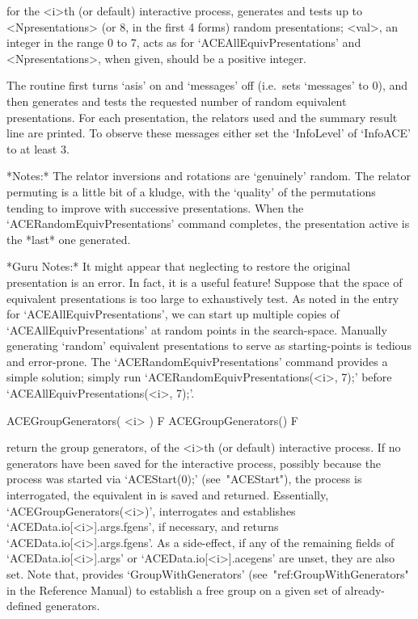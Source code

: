 for the <i>th (or default) interactive {\ACE} process,  generates  and
tests up to <Npresentations> (or 8,  in  the  first  4  forms)  random
presentations; <val>, an integer in the range 0  to  7,  acts  as  for
`ACEAllEquivPresentations' and <Npresentations>, when given, should be
a positive integer.

The routine first  turns  `asis'  on  and  `messages'  off  (i.e.~sets
`messages' to 0), and then generates and tests the requested number of
random equivalent presentations. For each presentation,  the  relators
used and the  summary  result  line  are  printed.  To  observe  these
messages either set the `InfoLevel' of `InfoACE'  to  at  least  3.

*Notes:*
The relator inversions and rotations are \lq{}genuinely'  random.  The
relator permuting is a little bit of a kludge, with the  \lq{}quality'
of the permutations tending to improve with successive  presentations.
When  the   `ACERandomEquivPresentations'   command   completes,   the
presentation active is the *last* one generated.

*Guru Notes:*
It might appear that neglecting to restore the  original  presentation
is an error. In fact, it is a useful feature! Suppose that  the  space
of equivalent presentations is too  large  to  exhaustively  test.  As
noted in the entry for `ACEAllEquivPresentations',  we  can  start  up
multiple copies of `ACEAllEquivPresentations' at random points in  the
search-space. Manually generating `random' equivalent presentations to
serve   as   starting-points   is   tedious   and   error-prone.   The
`ACERandomEquivPresentations'  command  provides  a  simple  solution;
simply    run    `ACERandomEquivPresentations(<i>,     7);'     before
`ACEAllEquivPresentations(<i>, 7);'.

\enditems


\beginitems

\>ACEGroupGenerators( <i> ) F
\>ACEGroupGenerators() F

return  the  {\GAP}  group  generators,  of  the  <i>th  (or  default)
interactive {\ACE} process. If no generators have been saved  for  the
interactive {\ACE} process, possibly because the process  was  started
via   `ACEStart(0);'   (see~"ACEStart"),   the   {\ACE}   process   is
interrogated,  the  equivalent  in  {\GAP}  is  saved  and   returned.
Essentially,  `ACEGroupGenerators(<i>)',   interrogates   {\ACE}   and
establishes `ACEData.io[<i>].args.fgens', if  necessary,  and  returns
`ACEData.io[<i>].args.fgens'.  As  a  side-effect,  if  any   of   the
remaining       fields       of       `ACEData.io[<i>].args'        or
`ACEData.io[<i>].acegens' are unset, they are  also  set.  Note  that,
{\GAP} provides  `GroupWithGenerators'  (see~"ref:GroupWithGenerators"
in the {\GAP} Reference Manual) to establish a free group on  a  given
set of already-defined generators.

